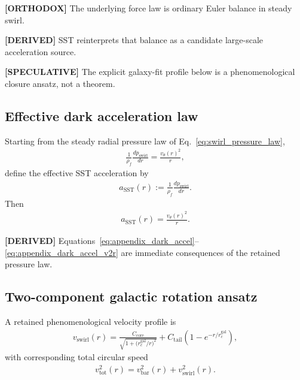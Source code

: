 \documentclass[11pt]{article}
\theoremstyle{definition}
\theoremstyle{plain}
\theoremstyle{remark}
\newcommand{\rhoF}{{\rho_{\!f}}}
\begin{document}
        \textbf{[ORTHODOX]} The underlying force law is ordinary Euler balance in steady swirl.
        
        \textbf{[DERIVED]} SST reinterprets that balance as a candidate large-scale acceleration source.
        
        \textbf{[SPECULATIVE]} The explicit galaxy-fit profile below is a phenomenological closure ansatz, not a theorem.
    
    \subsection{Effective dark acceleration law}
        Starting from the steady radial pressure law of Eq.~\eqref{eq:swirl_pressure_law},
        \begin{align}
            \frac{1}{\rhoF}\frac{dp_{\mathrm{swirl}}}{dr}
            =
            \frac{v_\theta(r)^2}{r},
        \end{align}
        define the effective SST acceleration by
        \begin{align}
            a_{\mathrm{SST}}(r)
            :=
            \frac{1}{\rhoF}\frac{dp_{\mathrm{swirl}}}{dr}.
            \label{eq:appendix_dark_accel}
        \end{align}
        Then
        \begin{align}
            a_{\mathrm{SST}}(r)=\frac{v_\theta(r)^2}{r}.
            \label{eq:appendix_dark_accel_v2r}
        \end{align}
        
        \textbf{[DERIVED]} Equations~\eqref{eq:appendix_dark_accel}--\eqref{eq:appendix_dark_accel_v2r} are immediate consequences of the retained pressure law.
    
    \subsection{Two-component galactic rotation ansatz}
        A retained phenomenological velocity profile is
        \begin{align}
            v_{\mathrm{swirl}}(r)
            =
            \frac{C_{\mathrm{core}}}{\sqrt{1+\bigl(r_c^{\mathrm{gal}}/r\bigr)^2}}
            +
            C_{\mathrm{tail}}
            \left(1-e^{-r/r_c^{\mathrm{gal}}}\right),
            \label{eq:galactic_velocity_ansatz}
        \end{align}
        with corresponding total circular speed
        \begin{align}
            v_{\mathrm{tot}}^2(r)
            =
            v_{\mathrm{bar}}^2(r)
            +
            v_{\mathrm{swirl}}^2(r).
            \label{eq:total_circular_speed_appendix}
        \end{align}
        
\end{document}
